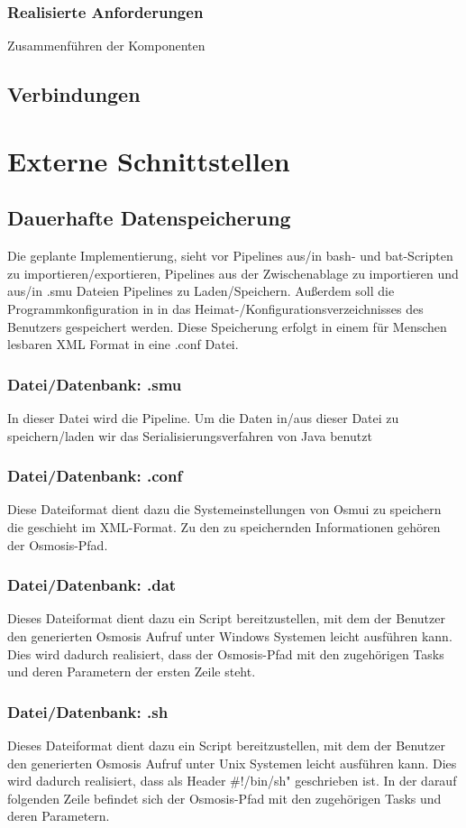 \documentclass[a4paper,12pt]{scrartcl}
\begin{document}
\subsubsection{Realisierte Anforderungen}
Zusammenführen der Komponenten


\subsection{Verbindungen}
\section{Externe Schnittstellen}
\subsection{Dauerhafte Datenspeicherung}
Die geplante Implementierung, sieht vor Pipelines aus/in bash- und bat-Scripten zu importieren/exportieren, Pipelines aus der Zwischenablage zu importieren und aus/in .smu Dateien Pipelines zu Laden/Speichern. Außerdem soll die Programmkonfiguration in in das Heimat-/Konfigurationsverzeichnisses des Benutzers gespeichert werden. Diese Speicherung erfolgt in einem für Menschen lesbaren XML Format in eine .conf Datei.
\subsubsection{Datei/Datenbank: .smu}
In dieser Datei wird die Pipeline. Um die Daten in/aus dieser Datei zu speichern/laden wir das Serialisierungsverfahren von Java benutzt 
\subsubsection{Datei/Datenbank: .conf}
Diese  Dateiformat dient dazu die Systemeinstellungen von Osmui zu speichern die geschieht im XML-Format. Zu den zu speichernden Informationen gehören der Osmosis-Pfad.
\subsubsection{Datei/Datenbank: .dat}
Dieses Dateiformat dient dazu ein Script bereitzustellen, mit dem der Benutzer den generierten Osmosis Aufruf unter Windows Systemen leicht ausführen kann. Dies wird dadurch realisiert, dass der Osmosis-Pfad mit den zugehörigen Tasks und deren Parametern der ersten Zeile steht.
\subsubsection{Datei/Datenbank: .sh}
Dieses Dateiformat dient dazu ein Script bereitzustellen, mit dem der Benutzer den generierten Osmosis Aufruf unter Unix Systemen leicht ausführen kann. Dies wird dadurch realisiert, dass als Header \glqq \#!/bin/sh" geschrieben ist. In der darauf folgenden Zeile befindet sich der Osmosis-Pfad mit den zugehörigen Tasks und deren Parametern.
\end{document}
